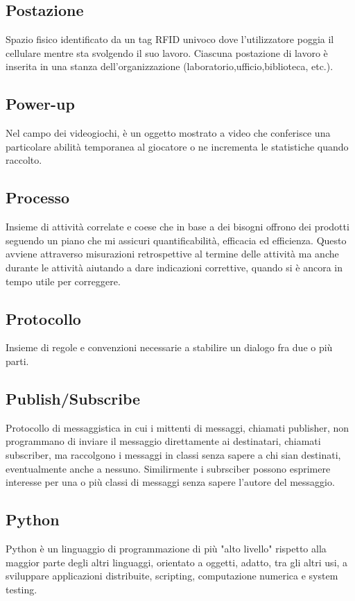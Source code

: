 \subsection{Postazione} Spazio fisico identificato da un tag RFID univoco dove l’utilizzatore poggia il
cellulare mentre sta svolgendo il suo lavoro. Ciascuna postazione di lavoro è inserita in una stanza
dell'organizzazione (laboratorio,ufficio,biblioteca, etc.).
\subsection{Power-up} Nel campo dei videogiochi, è un oggetto mostrato a video che conferisce una particolare abilità temporanea al giocatore o ne incrementa le statistiche quando raccolto.
\subsection{Processo} Insieme di attività correlate e coese che in base a dei bisogni offrono dei prodotti seguendo un piano che mi assicuri quantificabilità, efficacia ed efficienza. Questo avviene attraverso misurazioni retrospettive al termine delle attività ma anche durante le attività aiutando a dare indicazioni correttive, quando si è ancora in tempo utile per correggere.
\subsection{Protocollo} Insieme di regole e convenzioni necessarie a stabilire un dialogo fra due o più parti.
\subsection{Publish/Subscribe} Protocollo di messaggistica in cui i mittenti di messaggi, chiamati publisher, non programmano di inviare il messaggio direttamente ai destinatari, chiamati subscriber, ma raccolgono i messaggi in classi senza sapere a chi sian destinati, eventualmente anche a nessuno. Similirmente i subrsciber possono esprimere interesse per una o più classi di messaggi senza sapere l'autore del messaggio.
\subsection{Python} Python è un linguaggio di programmazione di più "alto livello" rispetto alla maggior parte degli altri linguaggi, orientato a oggetti, adatto, tra gli altri usi, a sviluppare applicazioni distribuite, scripting, computazione numerica e system testing.
